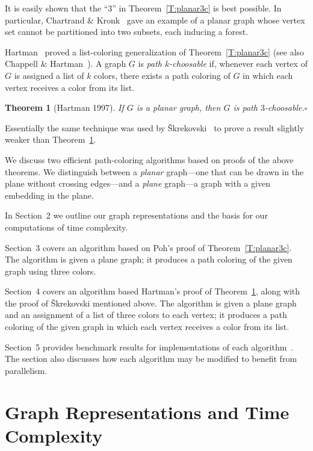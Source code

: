 \documentclass[12pt,letterpaper]{article}
\theoremstyle{plain}
\newtheorem{theorem}[lemma]{Theorem}         %
\theoremstyle{definition}
\theoremstyle{break}
\newcommand{\ggcqedsymbol}{$\square$}
\newcommand{\ggcqed}{\hbox{}\nobreak\hbox{\quad\ggcqedsymbol}}
\newcommand{\ggcnopf}{\ggcqed}
\newcommand{\defterm}[1]{\emph{#1}} %
\begin{document}
It is easily shown that the ``$3$'' in Theorem~\ref{T:planar3c}
is best possible.
In particular, Chartrand \& Kronk~\cite[Section~3]{ChKr1969}
gave an example of a planar graph whose vertex set cannot be partitioned
into two subsets, each inducing a forest.

Hartman~\cite[Thm.~4.1]{Har1997}
proved a list-coloring generalization of Theorem~\ref{T:planar3c}
(see also Chappell \& Hartman~\cite[Thm.~2.1]{ChHa2017prep}).
A graph $G$ is \defterm{path $k$-choosable} if,
whenever each vertex of $G$ is assigned a list of $k$ colors,
there exists a path coloring of $G$ in which each vertex receives
a color from its list.

\begin{theorem}[Hartman 1997]\label{T:planar3}
If $G$ is a planar graph,
then $G$ is path $3$-choosable.\ggcnopf\end{theorem}

Essentially the same technique was used by
\v{S}krekovski~\cite[Thm.~2.2b]{Skr1999}
to prove a result slightly weaker than Theorem~\ref{T:planar3}.


\medskip

We discuss two efficient path-coloring algorithms
based on proofs of the above theorems.
We distinguish between a \defterm{planar} graph---one that
can be drawn in the plane without crossing edges---and
a \defterm{plane} graph---a graph with a given embedding
in the plane.

In Section~2 we outline our graph representations
and the basis for our computations of time complexity.

Section~3 covers an algorithm
based on Poh's proof of Theorem~\ref{T:planar3c}.
The algorithm is given a plane graph;
it produces a path coloring of the given graph
using three colors.

Section~4 covers an algorithm
based Hartman's proof of Theorem~\ref{T:planar3},
along with the proof of \v{S}krekovski mentioned above.
The algorithm is given a plane graph
and an assignment of a list of three colors to each vertex;
it produces a path coloring of the given graph
in which each vertex receives a color from its list.

Section~5 provides benchmark results for implementations of each
algorithm~\cite{Bro2017}. The section also
discusses how each algorithm may be modified to benefit from parallelism.

\section{Graph Representations and Time Complexity}
\end{document}

